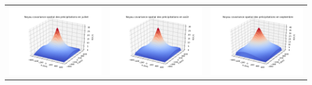 \documentclass[a4paper,10pt]{article}
\begin{document}
\begin{tabular}{ccc}
	\includegraphics[scale=0.4]{images/kernel_precip_m7.png} & \includegraphics[scale=0.4]{images/kernel_precip_m8.png} & \includegraphics[scale=0.4]{images/kernel_precip_m9.png} \\ 

\end{tabular}
\end{document}
